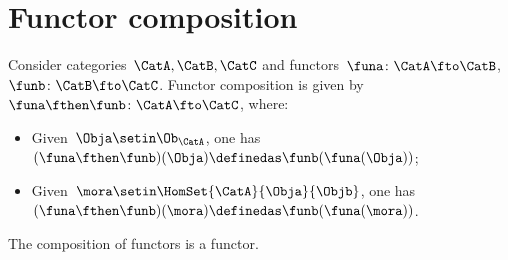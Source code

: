 
\section{Functor composition}

\begin{ctdefinition}
    \label{def:functor_composition}
    Consider categories~$\CatA,\CatB,\CatC$ and functors~$\funa\colon \CatA\fto \CatB$,~$\funb \colon \CatB\fto \CatC$.
    Functor composition is given by~$\funa\fthen \funb\colon \CatA \fto \CatC$, where:
    \begin{itemize}
        \item Given~$\Obja\setin \Ob_\CatA$, one has~$(\funa\fthen \funb)(\Obja)\definedas\funb(\funa(\Obja))$;
        \item Given~$\mora \setin \HomSet{\CatA}{\Obja}{\Objb}$, one has~$(\funa\fthen \funb)(\mora)\definedas \funb(\funa(\mora))$.
    \end{itemize}
\end{ctdefinition}

\begin{lemma}
    \label{lem:functors_compose}
    The composition of functors is a functor.
\end{lemma}


